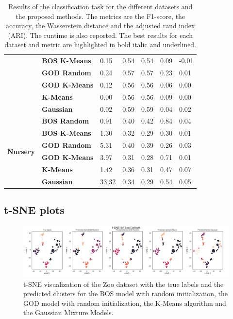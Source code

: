 \begin{table}
\begin{adjustbox}{width=\columnwidth}
\begin{tabular}{lllllll}
\textbf{} & \textbf{BOS K-Means} & 0.15 & 0.54 & 0.54 & 0.09 & -0.01 \\
\textbf{} & \textbf{GOD Random} & 0.24 & 0.57 & 0.57 & 0.23 & 0.01 \\
\textbf{} & \textbf{GOD K-Means} & 0.12 & 0.56 & 0.56 & 0.06 & 0.00 \\
\textbf{} & \textbf{K-Means} & 0.00 & 0.56 & 0.56 & 0.09 & 0.00 \\
\textbf{} & \textbf{Gaussian} & 0.02 & 0.59 & 0.59 & 0.04 & 0.02 \\
\cline{1-7}
\multirow[t]{6}{*}{\textbf{Nursery}} & \textbf{BOS Random} & 0.91 & 0.40 & 0.42 & 0.84 & 0.04 \\
\textbf{} & \textbf{BOS K-Means} & 1.30 & 0.32 & 0.29 & 0.30 & 0.01 \\
\textbf{} & \textbf{GOD Random} & 5.31 & 0.40 & 0.39 & 0.26 & 0.03 \\
\textbf{} & \textbf{GOD K-Means} & 3.97 & 0.31 & 0.28 & 0.71 & 0.01 \\
\textbf{} & \textbf{K-Means} & 1.42 & 0.36 & 0.31 & 0.47 & 0.07 \\
\textbf{} & \textbf{Gaussian} & 33.32 & 0.34 & 0.29 & 0.54 & 0.05 \\
\cline{1-7}
\bottomrule
\end{tabular}
\end{adjustbox}
\caption{
Results of the classification task for the different datasets and the proposed methods. The metrics are the F1-score, the accuracy, the Wasserstein distance and the adjusted rand index (ARI). 
The runtime is also reported. The best results for each dataset and metric are highlighted in bold italic and underlined. 
}
\label{tab:results_real}
\end{table}


\subsection{t-SNE plots}
\label{sec:appendix_tsne}

\begin{figure}[H]
    \centering
    \includegraphics[width=\textwidth]{python_figures/tsne_zoo.png}
    \caption{t-SNE visualization of the Zoo dataset with the true labels and the predicted clusters for the BOS model with random initialization, the GOD model with random initialization, the K-Means algorithm and the Gaussian Mixture Models.}
    \label{fig:tsne_zoo}
\end{figure}

